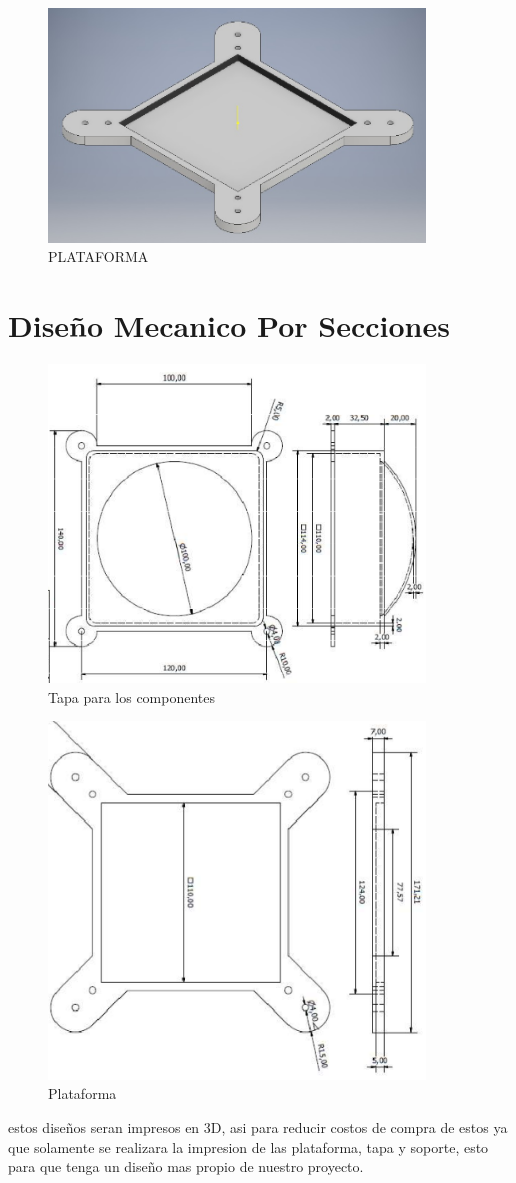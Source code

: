 \documentclass[11pt,a4paper]{article}
\begin{document}
\newpage
 
\begin{figure}[h]
\centering
\includegraphics[width=10cm]{Imagenes/PLATAFORMA.png} 
\caption{PLATAFORMA}
\end{figure}

\section{Diseño Mecanico Por Secciones}

\begin{figure}[h]
\centering
\includegraphics[width=10cm]{Imagenes/TAPA.png} 
\caption{Tapa para los componentes}
\end{figure}
\newpage 
\begin{figure}[h]
\centering
\includegraphics[width=10cm]{Imagenes/Plataforma2.png} 
\caption{Plataforma}
\end{figure}

estos diseños seran impresos en 3D, asi para reducir costos de compra de estos ya que solamente se realizara la impresion de las plataforma, tapa y soporte, esto para que tenga un diseño mas propio de nuestro proyecto.
\end{document}
